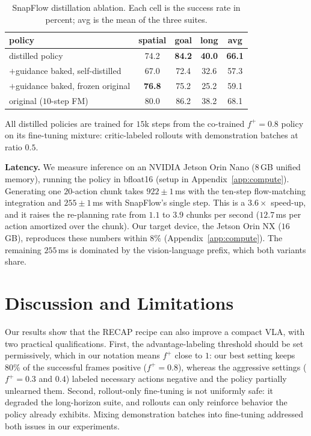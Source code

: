 \documentclass[conference]{IEEEtran}
\newcommand{\pf}{\ensuremath{f^{+}}}   %
\begin{document}
\begin{table}[t]
\caption{SnapFlow distillation ablation. Each cell is the success rate in percent; avg is
the mean of the three suites.}
\label{tab:distill}
\begin{center}
\begin{tabular}{lcccc}
\toprule
policy & spatial & goal & long & avg \\
\midrule
distilled policy                  & 74.2 & \textbf{84.2} & \textbf{40.0} & \textbf{66.1} \\
$+$guidance baked, self-distilled & 67.0 & 72.4 & 32.6 & 57.3 \\
$+$guidance baked, frozen original & \textbf{76.8} & 75.2 & 25.2 & 59.1 \\
\midrule
original ($10$-step FM)           & 80.0 & 86.2 & 38.2 & 68.1 \\
\bottomrule
\end{tabular}
\end{center}
{\footnotesize All distilled policies are trained for $15$k steps from the co-trained
$\pf{=}0.8$ policy on its fine-tuning mixture: critic-labeled rollouts with demonstration
batches at ratio $0.5$.}
\end{table}

\textbf{Latency.} We measure inference on an NVIDIA Jetson Orin Nano ($8$\,GB unified
memory), running the policy in bfloat16 (setup in Appendix~\ref{app:compute}). Generating
one $20$-action chunk takes $922\pm1$\,ms with the ten-step flow-matching integration and
$255\pm1$\,ms with SnapFlow's single step. This is a $3.6\times$ speed-up, and it raises
the re-planning rate from $1.1$ to $3.9$ chunks per second ($12.7$\,ms per action
amortized over the chunk). Our target device, the Jetson Orin NX ($16$\,GB), reproduces
these numbers within $8\%$ (Appendix~\ref{app:compute}). The remaining $255$\,ms is
dominated by the vision-language prefix, which both variants share.

\section{Discussion and Limitations}\label{sec:discussion}
Our results show that the RECAP recipe can also improve a compact VLA, with two practical
qualifications. First, the advantage-labeling threshold should be set permissively, which
in our notation means \pf{} close to $1$: our best setting keeps $80\%$ of the successful
frames positive ($\pf{=}0.8$), whereas the aggressive settings ($\pf{=}0.3$ and $0.4$)
labeled necessary actions negative and the policy partially unlearned them. Second,
rollout-only fine-tuning is not uniformly safe: it degraded the long-horizon suite, and
rollouts can only reinforce behavior the policy already exhibits. Mixing demonstration
batches into fine-tuning addressed both issues in our experiments.
\end{document}
